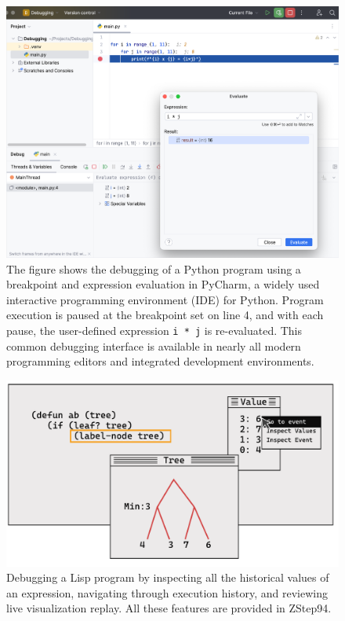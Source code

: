 \begin{figure}[hbt]
  \includegraphics[width=\linewidth]{BreakPoint}
  \caption{
    \label{fig:breakpoint}
    The figure shows the debugging of a Python program using a breakpoint and expression evaluation in PyCharm, a widely used interactive programming environment (IDE) for Python. Program execution is paused at the breakpoint set on line 4, and with each pause, the user-defined expression \texttt{i * j} is re-evaluated. This common debugging interface is available in nearly all modern programming editors and integrated development environments.
    }
\end{figure}


\begin{figure}[hbt]
  \includegraphics[width=\linewidth]{ZStep94}
  \caption{
    \label{fig:zstep94}
    Debugging a Lisp program by inspecting all the historical values of an expression, navigating through execution history, and reviewing live visualization replay.  All these features are provided in ZStep94.
    }
\end{figure}

